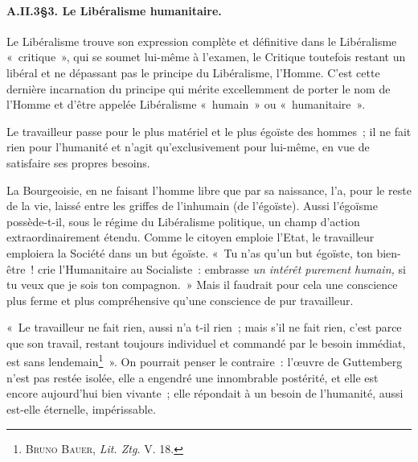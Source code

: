 \documentclass[french,twoside]{book} %
\begin{document}
\paragraph[{A.II.3§3. Le Libéralisme humanitaire.}]{A.II.3§3. Le Libéralisme humanitaire.}
\noindent Le Libéralisme trouve son expression complète et définitive dans le Libéralisme « critique », qui se soumet lui-même à l’examen, le Critique toutefois restant un libéral et ne dépassant pas le principe du Libéralisme, l’Homme. C’est cette dernière incarnation du principe qui mérite excellemment de porter le nom de l’Homme et d’être appelée Libéralisme « humain » ou « humanitaire ».\par
Le travailleur passe pour le plus matériel et le plus égoïste des hommes ; il ne fait rien pour l’humanité et n’agit qu’exclusivement pour lui-même, en vue de satisfaire ses propres besoins.\par
La Bourgeoisie, en ne faisant l’homme libre que par sa naissance, l’a, pour le reste de la vie, laissé entre les griffes de l’inhumain (de l’égoïste). Aussi l’égoïsme possède-t-il, sous le régime du Libéralisme politique, un champ d’action extraordinairement étendu. Comme le citoyen emploie l’Etat, le travailleur emploiera la Société dans un but égoïste. « Tu n’as qu’un but égoïste, ton bien-être ! crie l’Humanitaire au Socialiste : embrasse \emph{un intérêt purement humain,} si tu veux que je sois ton compagnon. » Mais il faudrait pour cela une conscience plus ferme et plus compréhensive qu’une conscience de pur travailleur.\par
« Le travailleur ne fait rien, aussi n’a t-il rien ; mais s’il ne fait rien, c’est parce que son travail, restant toujours individuel et commandé par le besoin immédiat, est sans lendemain\footnote{ \noindent B{\scshape runo} B{\scshape auer}, \emph{Lit. Ztg.} V. 18.
 } ». On pourrait penser  le contraire : l’œuvre de Guttemberg n’est pas restée isolée, elle a engendré une innombrable postérité, et elle est encore aujourd’hui bien vivante ; elle répondait à un besoin de l’humanité, aussi est-elle éternelle, impérissable.\par
\end{document}
